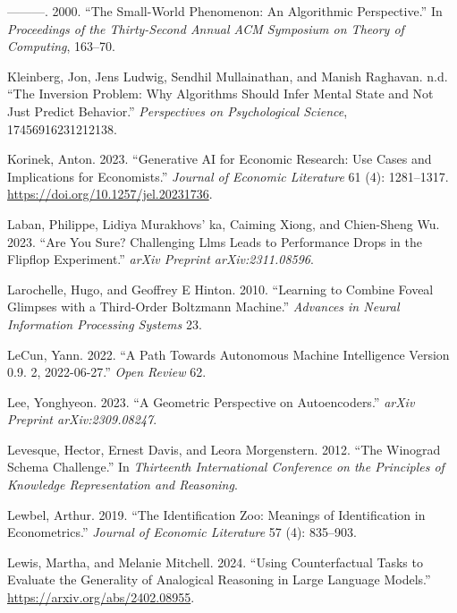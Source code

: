 \documentclass[
]{article}
\newlength{\cslhangindent}
\newenvironment{CSLReferences}[2] %
 {\begin{list}{}{%
  \setlength{\itemindent}{0pt}
  \setlength{\leftmargin}{0pt}
  \setlength{\parsep}{0pt}
  \ifodd #1
   \setlength{\leftmargin}{\cslhangindent}
   \setlength{\itemindent}{-1\cslhangindent}
  \fi
  \setlength{\itemsep}{#2\baselineskip}}}
 {\end{list}}
\begin{document}
\begin{CSLReferences}{1}{0}
---------. 2000. {``The Small-World Phenomenon: An Algorithmic
Perspective.''} In \emph{Proceedings of the Thirty-Second Annual ACM
Symposium on Theory of Computing}, 163--70.

Kleinberg, Jon, Jens Ludwig, Sendhil Mullainathan, and Manish Raghavan.
n.d. {``The Inversion Problem: Why Algorithms Should Infer Mental State
and Not Just Predict Behavior.''} \emph{Perspectives on Psychological
Science}, 17456916231212138.

Korinek, Anton. 2023. {``Generative AI for Economic Research: Use Cases
and Implications for Economists.''} \emph{Journal of Economic
Literature} 61 (4): 1281--1317.
\url{https://doi.org/10.1257/jel.20231736}.

Laban, Philippe, Lidiya Murakhovs' ka, Caiming Xiong, and Chien-Sheng
Wu. 2023. {``Are You Sure? Challenging Llms Leads to Performance Drops
in the Flipflop Experiment.''} \emph{arXiv Preprint arXiv:2311.08596}.

Larochelle, Hugo, and Geoffrey E Hinton. 2010. {``Learning to Combine
Foveal Glimpses with a Third-Order Boltzmann Machine.''} \emph{Advances
in Neural Information Processing Systems} 23.

LeCun, Yann. 2022. {``A Path Towards Autonomous Machine Intelligence
Version 0.9. 2, 2022-06-27.''} \emph{Open Review} 62.

Lee, Yonghyeon. 2023. {``A Geometric Perspective on Autoencoders.''}
\emph{arXiv Preprint arXiv:2309.08247}.

Levesque, Hector, Ernest Davis, and Leora Morgenstern. 2012. {``The
Winograd Schema Challenge.''} In \emph{Thirteenth International
Conference on the Principles of Knowledge Representation and Reasoning}.

Lewbel, Arthur. 2019. {``The Identification Zoo: Meanings of
Identification in Econometrics.''} \emph{Journal of Economic Literature}
57 (4): 835--903.

Lewis, Martha, and Melanie Mitchell. 2024. {``Using Counterfactual Tasks
to Evaluate the Generality of Analogical Reasoning in Large Language
Models.''} \url{https://arxiv.org/abs/2402.08955}.


\end{CSLReferences}
\end{document}
